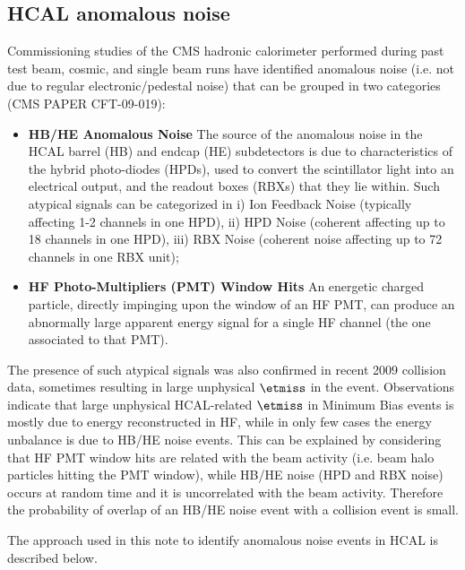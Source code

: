 \subsection{HCAL anomalous noise} \label{sec:HCALNoise}
Commissioning studies of the CMS hadronic calorimeter performed 
during past test beam, cosmic, and single beam runs have 
identified anomalous noise (i.e. not due to regular 
electronic/pedestal noise) that can be grouped in two categories 
(CMS PAPER CFT-09-019):
\begin{itemize}
\item{\bf HB/HE Anomalous Noise} The source of the anomalous noise in the HCAL 
barrel (HB) and endcap (HE) subdetectors is due to characteristics 
of the hybrid photo-diodes (HPDs), used to convert the scintillator light into 
an electrical output, and the readout boxes (RBXs) that they lie within.
Such atypical signals can be categorized 
in i) Ion Feedback Noise (typically affecting 1-2 channels in one HPD), ii) HPD Noise 
(coherent affecting up to 18 channels in one HPD), iii) RBX Noise 
(coherent noise affecting up to 72 channels in one RBX unit);
\item{\bf HF Photo-Multipliers (PMT) Window Hits} An energetic charged particle, directly 
impinging upon the window of an HF PMT, can produce an abnormally large apparent 
energy signal for a single HF channel (the one associated to that PMT). 
\end{itemize}

The presence of such atypical signals was also confirmed in recent 
2009 collision data, sometimes resulting in large unphysical $\etmiss$ in the event. 
Observations indicate that large unphysical HCAL-related $\etmiss$ 
in Minimum Bias events is mostly due to energy reconstructed in HF, 
while in only few cases the energy unbalance is due to HB/HE noise events. 
This can be explained by considering that HF PMT window hits 
are related with the beam activity (i.e. beam halo particles hitting the PMT window), 
while HB/HE noise (HPD and RBX noise) occurs at random time and it is 
uncorrelated with the beam activity. Therefore the probability of overlap 
of an HB/HE noise event with a collision event is small.

The approach used in this note to identify anomalous noise events in HCAL is described below.

